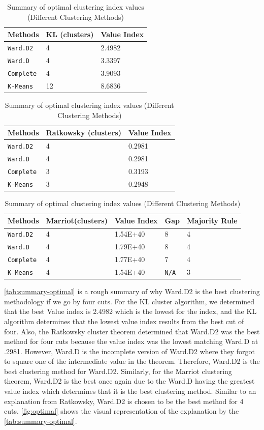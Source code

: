 \documentclass[10pt,twoside]{article}
\numberwithin{equation}{section}
\newcommand{\?}{\stackrel{?}{=}}
\begin{document}
\begin{table}[h!]
  \centering
  \begin{tabular}{p{1in} p{1in} p{1in}}\toprule
    \bf Methods & \bf KL (clusters) & \bf Value Index \\\midrule
    \texttt{Ward.D2} & 4 & 2.4982 \\\midrule
    \texttt{Ward.D} & 4 & 3.3397 \\\midrule
    \texttt{Complete} & 4 & 3.9093 \\\midrule
     \texttt{K-Means} & 12 & 8.6836  \\\bottomrule
  \end{tabular}
   \centering
  \begin{tabular}{p{1in} p{1in} p{1in}}\toprule
    \bf Methods & \bf Ratkowsky (clusters) & \bf Value Index \\\midrule
    \texttt{Ward.D2} & 4 & 0.2981 \\\midrule
    \texttt{Ward.D} & 4 & 0.2981 \\\midrule
    \texttt{Complete} & 3 & 0.3193 \\\midrule
     \texttt{K-Means} & 3 & 0.2948 \\\bottomrule
  \end{tabular}
   \centering
  \begin{tabular}{p{1in} p{1in} p{1in} p{1in} p{1in}}\toprule
    \bf Methods & \bf Marriot(clusters) & \bf Value Index & \bf Gap & \bf Majority Rule  \\\midrule
    \texttt{Ward.D2} & 4 & 1.54E+40 &  8 & 4 \\\midrule
    \texttt{Ward.D} & 4 & 1.79E+40 & 8 & 4 \\\midrule
    \texttt{Complete} & 4 & 1.77E+40  & 7 & 4 \\\midrule
     \texttt{K-Means} & 4 & 1.54E+40  & \texttt{N/A} & 3  \\\bottomrule
  \end{tabular}
  \caption{Summary of optimal clustering index values (Different Clustering Methods)}
  \label{tab:summary-optimal}
\end{table}

\autoref{tab:summary-optimal} is a rough summary of why Ward.D2 is the best clustering methodology if we go by four cuts. For the KL cluster algorithm, we determined that the best Value index is 2.4982 which is the lowest for the index, and the KL algorithm determines that the lowest value index results from the best cut of four. Also, the Ratkowsky cluster theorem determined that Ward.D2 was the best method for four cuts because the value index was the lowest matching Ward.D at .2981. However, Ward.D is the incomplete version of Ward.D2 where they forgot to square one of the intermediate value in the theorem. Therefore, Ward.D2 is the best clustering method for Ward.D2. Similarly, for the Marriot clustering theorem, Ward.D2 is the best once again due to the Ward.D having the greatest value index which determines that it is the best clustering method. Similar to an explanation from Ratkowsky, Ward.D2 is chosen to be the best method for 4 cuts. \autoref{fig:optimal} shows the visual representation of the explanation by the \autoref{tab:summary-optimal}. 
\end{document}
